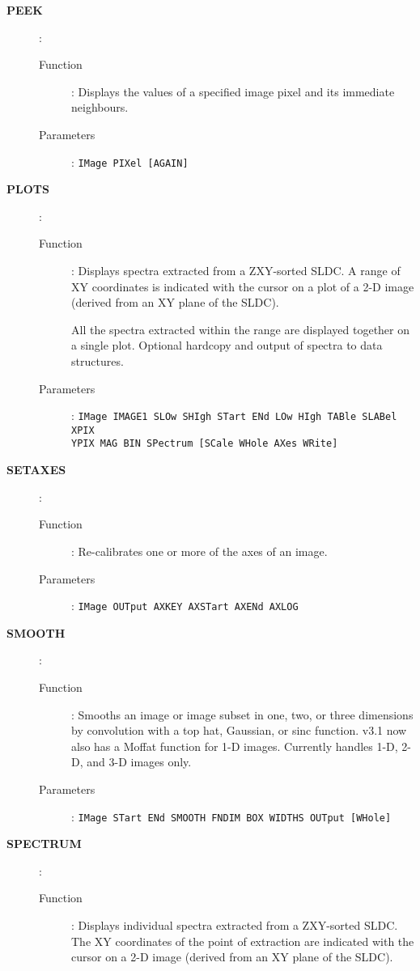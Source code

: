 \begin{description}
\item[\large\bf PEEK]:
   \begin{description}
   \item[Function]: 
      Displays the values of a specified image pixel and its immediate
      neighbours.
   \item[Parameters]: 
      {\tt IMage PIXel [AGAIN]}
   \end{description}

\item[\large\bf PLOTS]:
   \begin{description}
   \item[Function]:
      Displays spectra extracted from a ZXY-sorted SLDC. A range of XY
      coordinates is indicated with the cursor on a plot of a 2-D image
      (derived from an XY plane of the SLDC). 

      All the spectra extracted within the range are displayed together
      on a single plot. Optional hardcopy and output of spectra to data
      structures.
   \item[Parameters]:
      {\tt IMage IMAGE1 SLOw SHIgh STart ENd LOw HIgh TABle SLABel XPIX\\
      YPIX MAG BIN SPectrum [SCale WHole AXes WRite]}
   \end{description}

\item[\large\bf SETAXES]:
   \begin{description}
   \item[Function]: 
      Re-calibrates one or more of the axes of an image.
   \item[Parameters]: 
      {\tt IMage OUTput AXKEY AXSTart AXENd AXLOG}
   \end{description}

\item[\large\bf SMOOTH]:
   \begin{description}
   \item[Function]: 
      Smooths an image or image subset in one, two, or three dimensions
      by convolution with a top hat, Gaussian, or sinc function. v3.1
      now also has a Moffat function for 1-D images. Currently handles
      1-D, 2-D, and 3-D images only.
   \item[Parameters]: 
      {\tt IMage STart ENd SMOOTH FNDIM BOX WIDTHS OUTput [WHole]}
   \end{description}

\item[\large\bf SPECTRUM]:
   \begin{description}
   \item[Function]:
      Displays individual spectra extracted from a ZXY-sorted SLDC. The
      XY coordinates of the point of extraction are indicated with the
      cursor on a 2-D image (derived from an XY plane of the SLDC).


\end{description}
\end{description}

